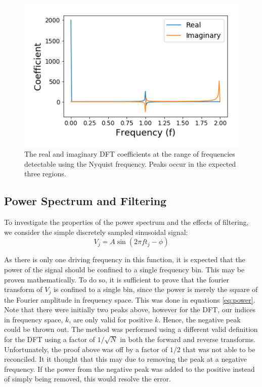 \documentclass[twocolumn]{article}
\begin{document}
\begin{figure}
\centering
\includegraphics[width=\linewidth]{Coefficients}
\caption{The real and imaginary DFT coefficients at the range of frequencies detectable using the Nyquist frequency. Peaks occur in the expected three regions.}
\label{fig:Coefficients}
\end{figure}


\subsection{Power Spectrum and Filtering}
To investigate the properties of the power spectrum and the effects of
filtering, we consider the simple discretely sampled sinusoidal signal:
\begin{equation}
  V_j = A \sin(2 \pi f t_j - \phi)
  \label{eq:sine}
\end{equation}

As there is only one driving frequency in this function, it is expected that the power of the signal should be confined to a single frequency bin. This may be proven mathematically. To do so, it is sufficient to prove that the fourier transform of $V_j$ is confined to a single bin, since the power is merely the square of the Fourier amplitude in frequency space. This was done in equations \ref{eq:power}. Note that there were initially two peaks above, however for the DFT, our indices in frequency space, $k$, are only valid for positive $k$. Hence, the negative peak could be thrown out. The method was performed using a different valid definition for the DFT using a factor of $1/\sqrt{N}$ in both the forward and reverse transforms. Unfortunately, the proof above was off by a factor of $1/2$ that was not able to be reconciled. It it thought that this may due to removing the peak at a negative frequency. If the power from the negative peak was added to the positive instead of simply being removed, this would resolve the error.
\end{document}
